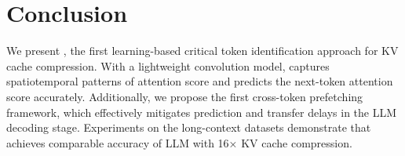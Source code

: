 \section{Conclusion}

We present \ours, the first learning-based critical token identification approach for KV cache compression. 
With a lightweight convolution model, \ours captures spatiotemporal patterns of attention score and predicts the next-token attention score accurately. 
Additionally, we propose the first cross-token prefetching framework, which effectively mitigates prediction and transfer delays in the LLM decoding stage. 
Experiments on the long-context datasets demonstrate that \ours achieves comparable accuracy of LLM with 16× KV cache compression.

